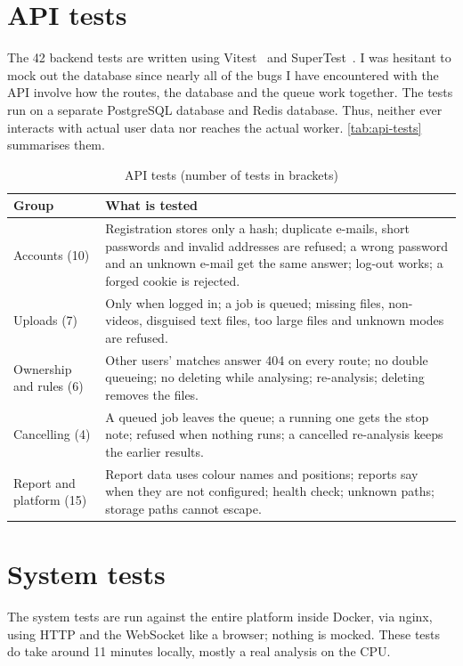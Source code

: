 \section{API tests}

The 42 backend tests are written using Vitest~\cite{vitest} and SuperTest~\cite{supertest}. I was hesitant to mock out the database since nearly all of the bugs I have encountered with the API  involve how the routes, the database and the queue work together. The tests run on a separate PostgreSQL database and Redis database. Thus, neither ever interacts with actual user data nor reaches the actual worker. \autoref{tab:api-tests} summarises them.

\begin{table}[H]
	\centering
	\begin{tabular}{|p{}|p{}|}
		\hline
		\textbf{Group} & \textbf{What is tested} \\
		\hline
		Accounts (10) & Registration stores only a hash; duplicate e-mails, short passwords and invalid addresses are refused; a wrong password and an unknown e-mail get the same answer; log-out works; a forged cookie is rejected. \\
		\hline
		Uploads (7) & Only when logged in; a job is queued; missing files, non-videos, disguised text files, too large files and unknown modes are refused. \\
		\hline
		Ownership and rules (6) & Other users' matches answer 404 on every route; no double queueing; no deleting while analysing; re-analysis; deleting removes the files. \\
		\hline
		Cancelling (4) & A queued job leaves the queue; a running one gets the stop note; refused when nothing runs; a cancelled re-analysis keeps the earlier results. \\
		\hline
		Report and platform (15) & Report data uses colour names and positions; reports say when they are not configured; health check; unknown paths; storage paths cannot escape. \\
		\hline
	\end{tabular}
	\caption{API tests (number of tests in brackets)}
	\label{tab:api-tests}
\end{table}

\section{System tests}

The system tests are run against the entire platform inside Docker, via nginx, using HTTP and the WebSocket like a browser; nothing is mocked. These tests do take around 11 minutes locally, mostly a real analysis on the CPU.

